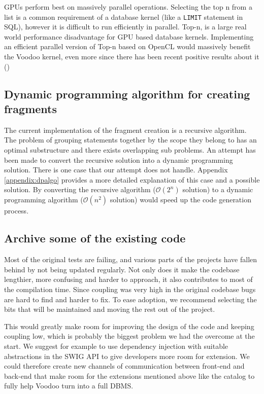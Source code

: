 GPUs perform best on massively parallel operations. Selecting the top n from a list is a common requirement of a database kernel (like a \texttt{LIMIT} statement in SQL), however it is difficult to run efficiently in parallel. Top-n, is a large real world performance disadvantage for GPU based database kernels. Implementing an efficient parallel version of Top-n based on OpenCL would massively benefit the Voodoo kernel, even more since there has been recent positive results about it (\cite{Shanbhag:2018:ETQ:3183713.3183735})

\subsection{Dynamic programming algorithm for creating fragments}

The current implementation of the fragment creation is a recursive algorithm. The problem of grouping statements together by the scope they belong to has an optimal substructure and there exists overlapping sub problems. An attempt has been made to convert the recursive solution into a dynamic programming solution. There is one case that our attempt does not handle. Appendix \ref{appendix:dpalgo} provides a more detailed explanation of this case and a possible solution. By converting the recursive algorithm ($\mathcal{O}(2^n)$ solution) to a dynamic programming algorithm ($\mathcal{O}(n^2)$ solution) would speed up the code generation process.

\subsection{Archive some of the existing code}

Most of the original tests are failing, and various parts of the projects have fallen behind by not being updated regularly. Not only does it make the codebase lengthier, more confusing and harder to approach, it also contributes to most of the compilation time. Since coupling was very high in the original codebase bugs are hard to find and harder to fix. To ease adoption, we recommend selecting the bits that will be maintained and moving the rest out of the project.

This would greatly make room for improving the design of the code and keeping coupling low, which is probably the biggest problem we had the overcome at the start. We suggest for example to use dependency injection with suitable abstractions in the SWIG API to give developers more room for extension. We could therefore create new channels of communication between front-end and back-end that make room for the extensions mentioned above like the catalog to fully help Voodoo turn into a full DBMS.